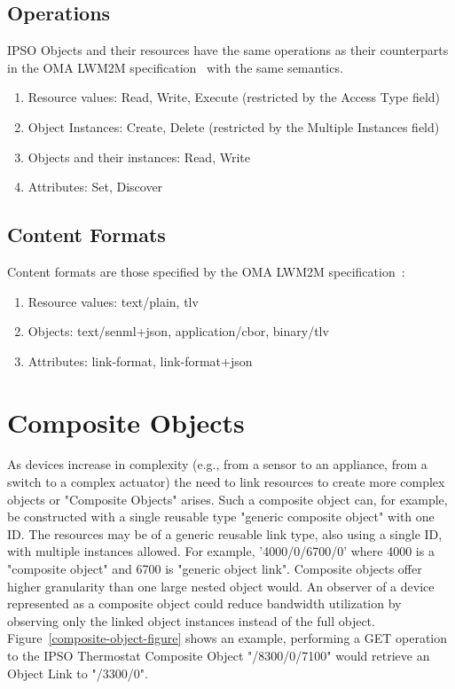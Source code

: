 \documentclass[peerreview, a4paper, 7pt]{IEEEtran}
\begin{document}
\subsection{Operations}

IPSO Objects and their resources have the same operations as their counterparts in the OMA LWM2M specification~\cite{lwm2m} with the same semantics.

\begin{enumerate}
\item Resource values: Read, Write, Execute (restricted by the Access Type field)
\item Object Instances: Create, Delete (restricted by the Multiple Instances field)
\item Objects and their instances: Read, Write
\item Attributes: Set, Discover
\end{enumerate}

\subsection{Content Formats}

Content formats are those specified by the OMA LWM2M specification~\cite{lwm2m}:
\begin{enumerate}
\item Resource values: text/plain, tlv
\item Objects: text/senml+json, application/cbor, binary/tlv
\item Attributes: link-format, link-format+json
\end{enumerate}


\section{Composite Objects}

As devices increase in complexity (e.g., from a sensor to an appliance, from a switch to a complex actuator) the need to link resources to create more complex objects or "Composite Objects" arises. Such a composite object can, for example, be constructed with a single reusable type "generic composite object" with one ID. The resources may be of a generic reusable link type, also using a single ID, with multiple instances allowed. For example, '4000/0/6700/0' where 4000 is a "composite object" and 6700 is "generic object link". Composite objects offer higher granularity than one large nested object would. An observer of a device represented as a composite object could reduce bandwidth utilization by observing only the linked object instances instead of the full object. Figure~\ref{composite-object-figure} shows an example, performing a GET operation to the IPSO Thermostat Composite Object "/8300/0/7100" would retrieve an Object Link to "/3300/0".
\end{document}
